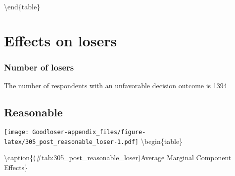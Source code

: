 \documentclass[
]{book}
\begin{document}
\textbackslash end\{table\}

\hypertarget{effects-on-losers-2}{%
\chapter{Effects on losers}\label{effects-on-losers-2}}

\hypertarget{number-of-losers}{%
\subsection{Number of losers}\label{number-of-losers}}

The number of respondents with an unfavorable decision outcome is 1394

\hypertarget{reasonable}{%
\section{Reasonable}\label{reasonable}}

\texttt{[image: Goodloser-appendix\_files/figure-latex/305\_post\_reasonable\_loser-1.pdf]} \textbackslash begin\{table\}

\textbackslash caption\{(\#tab:305\_post\_reasonable\_loser)Average Marginal Component Effects\}
\centering
\end{document}
